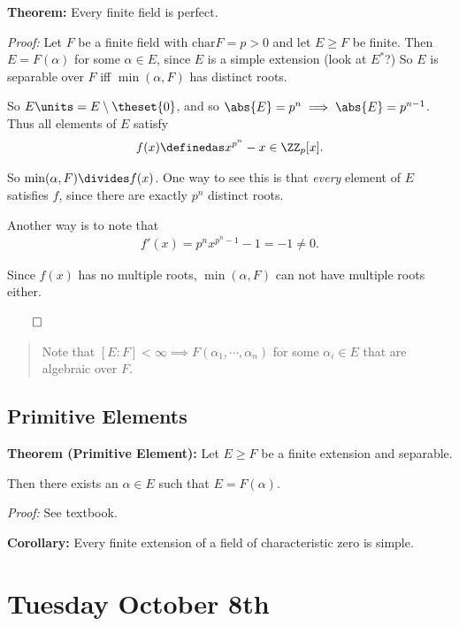 \textbf{Theorem:} Every finite field is perfect.

\emph{Proof:} Let \(F\) be a finite field with
\(\mathrm{char} F = p > 0\) and let \(E \geq F\) be finite. Then
\(E = F(\alpha)\) for some \(\alpha\in E\), since \(E\) is a simple
extension (look at \(E^*\)?) So \(E\) is separable over \(F\) iff
\(\min(\alpha, F)\) has distinct roots.

So \(E\units = E\setminus\theset{0}\), and so
\(\abs{E} = p^n \implies \abs{E} = p^{n-1}\). Thus all elements of \(E\)
satisfy
\begin{align*}
f(x) \definedas x^{p^n} - x \in \ZZ_p[x]
.\end{align*}

So \(\min(\alpha, F) \divides f(x)\). One way to see this is that
\emph{every} element of \(E\) satisfies \(f\), since there are exactly
\(p^n\) distinct roots.

Another way is to note that
\begin{align*}
f'(x) = p^nx^{p^n - 1} - 1 = -1 \neq 0
.\end{align*}

Since \(f(x)\) has no multiple roots, \(\min(\alpha, F)\) can not have
multiple roots either.

\(\qed\)

\begin{quote}
Note that \([E: F] < \infty \implies F(\alpha_1, \cdots, \alpha_n)\) for
some \(\alpha_i \in E\) that are algebraic over \(F\).
\end{quote}

\hypertarget{primitive-elements}{%
\subsection{Primitive Elements}\label{primitive-elements}}

\textbf{Theorem (Primitive Element):} Let \(E\geq F\) be a finite
extension and separable.

Then there exists an \(\alpha \in E\) such that \(E = F(\alpha)\).

\emph{Proof:} See textbook.

\textbf{Corollary:} Every finite extension of a field of characteristic
zero is simple.

\hypertarget{tuesday-october-8th}{%
\section{Tuesday October 8th}\label{tuesday-october-8th}}

